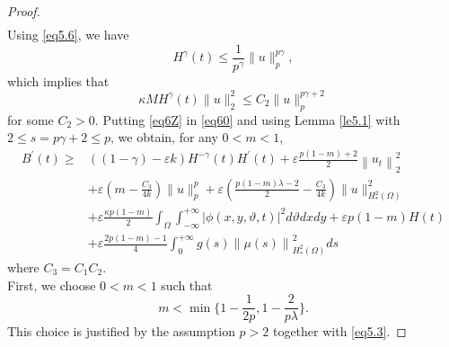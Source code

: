 \documentclass[12pt]{article}
\numberwithin{equation}{section}
\begin{document}
\begin{proof}
\begin{equation}
\begin{split}
\label{eq60}
\end{split}
\end{equation}
Using \eqref{eq5.6}, we have
\begin{equation*}
H^{\gamma}(t) \leq \frac{1}{p^{\gamma}}\|u\|_{p}^{p \gamma},
\end{equation*}
which implies that
\begin{equation}\label{eq6Z}
\kappa M H^{\gamma}(t)\|u\|_{2}^{2} \leq C_{2}\|u\|_{p}^{p \gamma+2}
\end{equation}
for some $C_{2}>0$. Putting \eqref{eq6Z} in \eqref{eq60} and using Lemma \ref{le5.1} with $2\leq s=p \gamma+2 \leq p$, we obtain, for any $0<m<1$,
\begin{equation}
\begin{aligned}
B^{\prime}(t) \geq & ((1-\gamma)-\varepsilon k) H^{-\gamma}(t) H^{\prime}(t)+\varepsilon\frac{p(1-m)+2}{2}\left\|u_{t}\right\|_{2}^{2} \\
& +\varepsilon\left(m-\frac{C_{3}}{4 k}\right)\|u\|_{p}^{p}+\varepsilon\left(\frac{p(1-m)\lambda -2}{2}-\frac{C_{3}}{4k}\right)\|u\|^{2}_{H^2_{*}(\Omega)} \\
& +\varepsilon\frac{\kappa p(1-m)}{2}  \int_{\Omega} \int_{-\infty}^{+\infty}|\phi(x,y,\vartheta,t)|^{2} d\vartheta dx dy+\varepsilon p(1-m)H(t)\\
& +\varepsilon\frac{2p(1-m)-1}{4}\int_{0}^{+\infty} g(s)\left\|\mu(s)\right\|^{2}_{H^2_{*}(\Omega)} ds
\end{aligned}
\end{equation}
where $C_{3}=C_1 C_{2}$. \\
First, we choose $0<m<1$ such that
$$m<\min\Big\{1-\frac{1}{2p}, 1-\frac{2}{p\lambda} \Big\}.$$
This choice is justified by the assumption $p>2$ together with \eqref{eq5.3}.


\end{proof}
\end{document}
